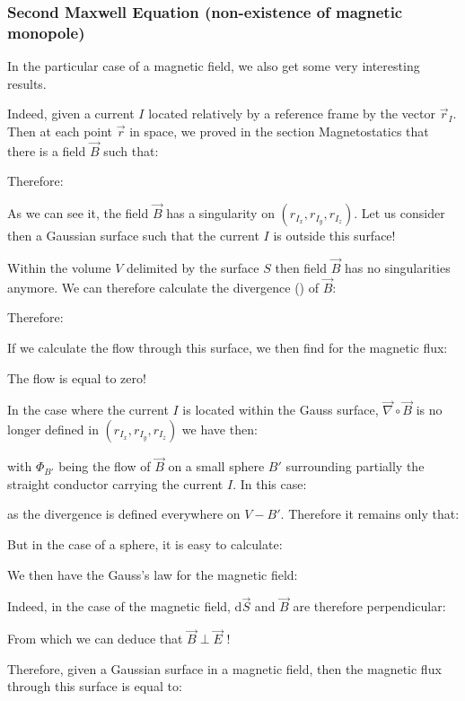 	\subsubsection{Second Maxwell Equation (non-existence of magnetic monopole)}
	In the particular case of a magnetic field, we also get some very interesting results.
	
	Indeed, given a current $I$ located relatively by a reference frame by the vector $\vec{r}_I$. Then at each point $\vec{r}$ in space, we proved in the section Magnetostatics that there is a field $\vec{B}$ such that:
	
	Therefore:
	
	As we can see it, the field $\vec{B}$ has a singularity on $(r_{I_x},r_{I_y},r_{I_z})$. Let us consider then a Gaussian surface such that the current $I$ is outside this surface!

	Within the volume $V$ delimited by the surface $S$ then field $\vec{B}$ has no singularities anymore. We can therefore calculate the divergence () of $\vec{B}$:
	
	Therefore:
	
	If we calculate the flow through this surface, we then find for the magnetic flux:
	
	The flow is equal to zero!
	
	In the case where the current $I$ is located within the Gauss surface, $\vec{\nabla}\circ\vec{B}$ is no longer defined in $(r_{I_x},r_{I_y},r_{I_z})$ we have then:
	
	with $\Phi_{B'}$ being the flow of $\vec{B}$ on a small sphere $B'$ surrounding partially the straight conductor carrying the current $I$. In this case:
	
	as the divergence is defined everywhere on $V-B'$. Therefore it remains only that:
	
	But in the case of a sphere, it is easy to calculate:
	
	We then have the Gauss's law for the magnetic field:
	
	Indeed, in the case of the magnetic field, $\mathrm{d}\vec{S}$ and $\vec{B}$ are therefore perpendicular:
	
	\begin{tcolorbox}[title=Remark,colframe=black,arc=10pt]
	From which we can deduce that $\vec{B} \perp\vec{E}$ !
	\end{tcolorbox}
	Therefore, given a Gaussian surface in a magnetic field, then the magnetic flux through this surface is equal to:
	
